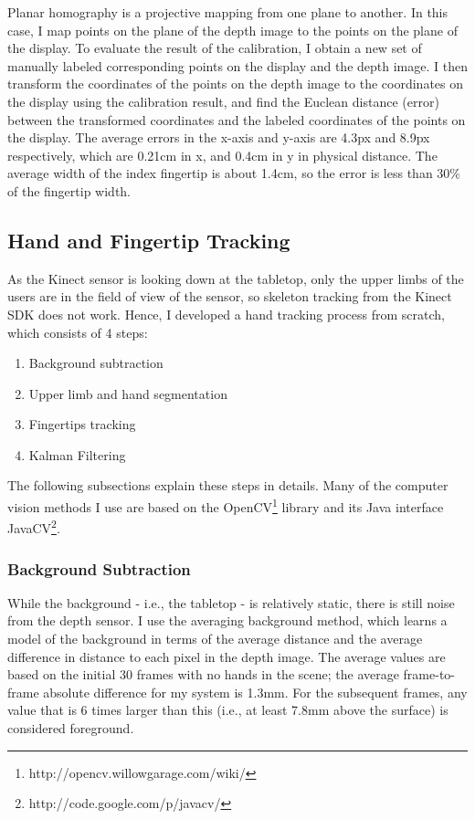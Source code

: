 Planar homography is a projective mapping from one plane to another. In this
case, I map points on the plane of the depth image to the points
on the plane of the display. To evaluate the result of the calibration, I
obtain a new set of manually labeled corresponding points on the display and the
depth image. I then transform the coordinates of the points on the depth image
to the coordinates on the display using the calibration result, and find the
Euclean distance (error) between the transformed coordinates and the labeled
coordinates of the points on the display. The average errors in the x-axis and
y-axis are 4.3px and 8.9px respectively, which are 0.21cm in x, and 0.4cm in y
in physical distance. The average width of the index fingertip is about 1.4cm,
so the error is less than 30\% of the fingertip width. 

\subsection{Hand and Fingertip Tracking}
As the Kinect sensor is looking down at the tabletop, only the upper limbs of
the users are in the field of view of the sensor, so skeleton
tracking from the Kinect SDK does not work. Hence, I developed a hand
tracking process from scratch, which consists of 4 steps:

\begin{enumerate}
  \item Background subtraction
  \item Upper limb and hand segmentation
  \item Fingertips tracking
  \item Kalman Filtering
\end{enumerate}

The following subsections explain these steps in details.
Many of the computer vision methods I use are based on the OpenCV\footnote{http://opencv.willowgarage.com/wiki/} library and its Java interface 
JavaCV\footnote{http://code.google.com/p/javacv/}.

\subsubsection{Background Subtraction}
While the background - i.e., the tabletop - is relatively static, there is
still noise from the depth sensor. I use the averaging background method, which
learns a model of the background in terms of the average distance and the
average difference in distance to each pixel in the depth image. The average
values are based on the initial 30 frames with no hands in the scene; the average frame-to-frame absolute difference for my system is 1.3mm. For the subsequent frames, any value that is 6 times larger than this (i.e., at least 7.8mm above the surface) is considered
foreground.

